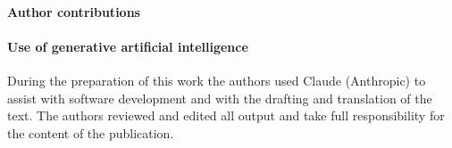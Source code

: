\paragraph{Author contributions} 

\paragraph{Use of generative artificial intelligence} During the preparation of this work the
authors used Claude (Anthropic) to assist with software development and with the drafting and
translation of the text. The authors reviewed and edited all output and take full responsibility
for the content of the publication.
\normalsize
